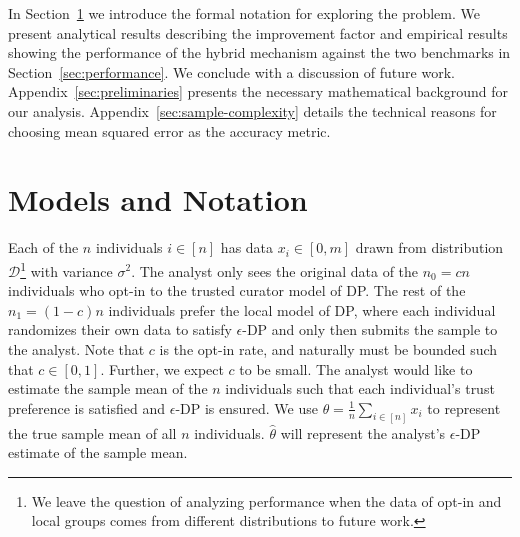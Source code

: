 \documentclass{article}
\theoremstyle{plain}
\begin{document}
In Section~\ref{sec:notation} we introduce the formal notation for exploring the problem. We present analytical results describing the improvement factor and empirical results showing the performance of the hybrid mechanism against the two benchmarks in Section~\ref{sec:performance}. We conclude with a discussion of future work. Appendix~\ref{sec:preliminaries} presents the necessary mathematical background for our analysis. Appendix~\ref{sec:sample-complexity} details the technical reasons for choosing mean squared error as the accuracy metric.



\section{Models and Notation}\label{sec:notation}
Each of the $n$ individuals $i \in [n]$ has data $x_i \in [0, m]$ drawn from distribution $\mathcal{D}$\footnote{We leave the question of analyzing performance when the data of opt-in and local groups comes from different distributions to future work.} with variance $\sigma^2$. The analyst only sees the original data of the $n_0 = c n$ individuals who opt-in to the trusted curator model of DP. The rest of the $n_1 = (1-c) n$ individuals prefer the local model of DP, where each individual randomizes their own data to satisfy $\epsilon$-DP and only then submits the sample to the analyst. Note that $c$ is the opt-in rate, and naturally must be bounded such that $c \in [0,1]$. Further, we expect $c$ to be small. The analyst would like to estimate the sample mean of the $n$ individuals such that each individual's trust preference is satisfied and $\epsilon$-DP is ensured. We use $\theta = \frac{1}{n}\sum_{i \in [n]}x_i$ to represent the true sample mean of all $n$ individuals. $\hat{\theta}$ will represent the analyst's $\epsilon$-DP estimate of the sample mean.
\end{document}
